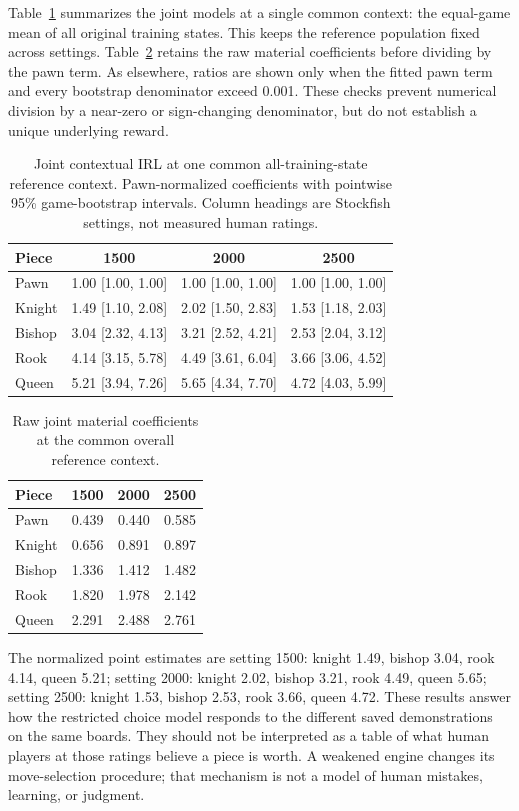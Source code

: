 Table~\ref{tab:elovalues} summarizes the joint models at a single common context: the equal-game mean of all original training states. This keeps the reference population fixed across settings. Table~\ref{tab:eloraw} retains the raw material coefficients before dividing by the pawn term. As elsewhere, ratios are shown only when the fitted pawn term and every bootstrap denominator exceed 0.001. These checks prevent numerical division by a near-zero or sign-changing denominator, but do not establish a unique underlying reward.
\begin{table}[t]\centering
\small
\caption{Joint contextual IRL at one common all-training-state reference context. Pawn-normalized coefficients with pointwise 95\% game-bootstrap intervals. Column headings are Stockfish settings, not measured human ratings.}\label{tab:elovalues}
\begin{tabular}{lccc}
\toprule
Piece & 1500 & 2000 & 2500\\\midrule
Pawn & 1.00 [1.00, 1.00] & 1.00 [1.00, 1.00] & 1.00 [1.00, 1.00]\\
Knight & 1.49 [1.10, 2.08] & 2.02 [1.50, 2.83] & 1.53 [1.18, 2.03]\\
Bishop & 3.04 [2.32, 4.13] & 3.21 [2.52, 4.21] & 2.53 [2.04, 3.12]\\
Rook & 4.14 [3.15, 5.78] & 4.49 [3.61, 6.04] & 3.66 [3.06, 4.52]\\
Queen & 5.21 [3.94, 7.26] & 5.65 [4.34, 7.70] & 4.72 [4.03, 5.99]\\
\bottomrule\end{tabular}\end{table}
\begin{table}[htbp]\centering
\small
\caption{Raw joint material coefficients at the common overall reference context.}\label{tab:eloraw}
\begin{tabular}{lrrr}
\toprule
Piece & 1500 & 2000 & 2500\\\midrule
Pawn & 0.439 & 0.440 & 0.585\\
Knight & 0.656 & 0.891 & 0.897\\
Bishop & 1.336 & 1.412 & 1.482\\
Rook & 1.820 & 1.978 & 2.142\\
Queen & 2.291 & 2.488 & 2.761\\
\bottomrule\end{tabular}\end{table}

The normalized point estimates are setting 1500: knight 1.49, bishop 3.04, rook 4.14, queen 5.21; setting 2000: knight 2.02, bishop 3.21, rook 4.49, queen 5.65; setting 2500: knight 1.53, bishop 2.53, rook 3.66, queen 4.72. These results answer how the restricted choice model responds to the different saved demonstrations on the same boards. They should not be interpreted as a table of what human players at those ratings believe a piece is worth. A weakened engine changes its move-selection procedure; that mechanism is not a model of human mistakes, learning, or judgment.

